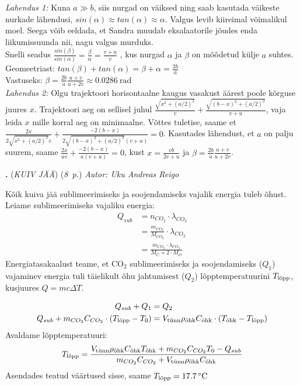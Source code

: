 \documentclass[11pt,a5paper]{article}
\newcommand{\numb}[1]{\vspace{5pt}\textbf{\large #1}}
\newcommand{\nimi}[1]{(\textsl{\small #1})}
\newcommand{\punktid}[1]{(\emph{#1~p.})}
\newcounter{ylesanne}
\newcommand{\yl}[1]{\addtocounter{ylesanne}{1}\numb{\theylesanne.} \nimi{#1} \newblock{}}
\newcommand{\autor}[1]{\emph{ Autor: #1}}%
\begin{document}
\emph{Lahendus 1:} Kuna $a \gg b$, siis nurgad on väiksed ning saab kasutada väikeste nurkade lähendusi, $ sin(\alpha) \approx tan( \alpha) \approx \alpha $. Valgus levib kiireimal võimalikul moel. Seega võib eeldada, et Sandra muudab eksalaatorile jõudes enda liikumissuunda nii, nagu valgus murduks.\\
Snelli seadus $ \frac{sin(\beta)}{sin(\alpha)} = \frac{\beta}{\alpha} = \frac{v+u}{v} $ , kus nurgad $\alpha$ ja $\beta$ on mõõdetud külje $a$  suhtes.\\
Geomeetriast: $ tan(\beta) + tan(\alpha) = \beta + \alpha =\frac{2b}{a}$\\
Vastuseks: $ \beta = \frac{2b}{a} \frac{u+v}{u+2v} \approx \SI{0,0286}{\radian}$\\


\emph{Lahendus 2:} Olgu trajektoori horisontaalne kaugus vasakust äärest poole kõrguse juures $x$. Trajektoori aeg on sellisel juhul $\frac{\sqrt{x^2+(a/2)^2}}{v} + \frac{\sqrt{(b-x)^2+(a/2)^2}}{v+u}$, vaja leida $x$ mille korral aeg on minimaalne. Võttes tuletise, saame et $\frac{2x}{2\sqrt{x^2+(a/2)^2}v} + \frac{-2(b-x)}{2\sqrt{(b-x)^2+(a/2)^2}(v+u)} = 0$. Kasutades lähendust, et $a$ on palju suurem, saame $\frac{2x}{av} + \frac{-2(b-x)}{a(v+u)} = 0$, kust $x = \frac{vb}{2v+u}$ ja $\beta = \frac{2b}{a} \frac{u+v}{u+2v}$.


\yl{KUIV JÄÄ}
\punktid{8} \autor{Uku Andreas Reigo}

Kõik kuiva jää sublimeerimiseks ja soojendamiseks vajalik energia tuleb õhust. Leiame sublimeerimiseks vajaliku energia:
\begin{align*}
    Q_{sub} &= n_{CO_2} \cdot \lambda_{CO_2}\\
    &= \frac{m_{CO_2}}{M_{CO_2}} \cdot \lambda_{CO_2}\\
    &= \frac{m_{CO_2}\cdot \lambda_{CO_2}}{M_{C} + 2\cdot M_{O}}
\end{align*}
Energiatasakaalust teame, et CO\(_2\) sublimeerimiseks ja soojendamiseks (\(Q_1\)) vajaminev energia tuli täielikult õhu jahtumisest (\(Q_2\)) lõpptemperatuurini \(T_{\textup{lõpp}}\), kusjuures \(Q = mc\Delta T\).

\begin{align*}
    Q_{sub} + Q_1 &= Q_2 \\
    Q_{sub} + m_{CO_2}C_{CO_{2}}\cdot(T_{\textup{lõpp}}-T_{0}) &= V_{\textup{tünn}}\rho_{\textup{õhk}}C_{\textup{õhk}}\cdot(T_{\textup{õhk}}-T_{\textup{lõpp}})\\
\end{align*}
Avaldame lõpptemperatuuri:
\begin{equation*}
    T_{\textup{lõpp}} = \frac{V_{\textup{tünn}}\rho_{\textup{õhk}}C_{\textup{õhk}}T_{\textup{õhk}}+m_{CO_2}C_{CO_{2}}T_{0}-Q_{sub}}{m_{CO_2}C_{CO_{2}}+V_{\textup{tünn}}\rho_{\textup{õhk}}C_{\textup{õhk}}}
\end{equation*}
Asendades teatud väärtused sisse, saame \(T_{\textup{lõpp}} = \SI{17,7}{\degreeCelsius}\) 
\end{document}
